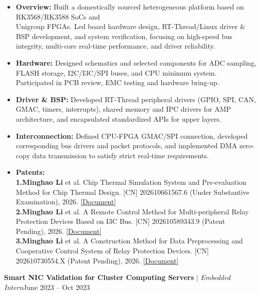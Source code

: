 \documentclass[10pt,a4paper]{article}
\begin{document}
\begin{itemize}[leftmargin=*, itemsep=0pt, parsep=0pt, topsep=2pt]
   \item \textbf{Overview: }Built a domestically sourced heterogeneous platform based on RK3568/RK3588 SoCs and \\Unigroup FPGAs. Led board hardware design, RT-Thread/Linux driver \& BSP development, and system verification, focusing on high-speed bus integrity, multi-core real-time performance, and driver reliability.
    \item \textbf{Hardware: }Designed schematics and selected components for ADC sampling, FLASH storage, I2C/I3C/SPI buses, and CPU minimum system. Participated in PCB review, EMC testing and hardware bring-up.
    \item \textbf{Driver \& BSP: }Developed RT-Thread peripheral drivers (GPIO, SPI, CAN, GMAC, timers, interrupts), shared memory and IPC drivers for AMP architecture, and encapsulated standardized APIs for upper layers.
   \item  \textbf{Interconnection:} Defined CPU-FPGA GMAC/SPI connection, developed  corresponding bus drivers and packet protocols, and implemented DMA zero-copy data transmission to satisfy strict real-time requirements.
   \item \textbf{Patents:}
   \\\textbf{1.Minghao Li} et al. Chip Thermal Simulation System and Pre-evaluation Method for Chip Thermal Design. 
    [CN] 202610661567.6 (Under Substantive Examination), 2026. \href{}{[Document]}\\
    \textbf{2.Minghao Li} et al. A Remote Control Method for Multi-peripheral Relay Protection Devices Based on I3C Bus. [CN] 202610589343.9 (Patent Pending), 2026. \href{}{[Document]}\\
    \textbf{3.Minghao Li} et al. A Construction Method for Data Preprocessing and Cooperative Control System of Relay Protection Devices. [CN] 202610730554.X (Patent Pending), 2026. \href{}{[Document]}

\end{itemize}
\vspace{8pt}
\noindent
\textbf{Smart NIC Validation for Cluster Computing Servers} $\vert$ \textit{Embedded Intern}\hfill June 2023 -- Oct 2023
\end{document}
